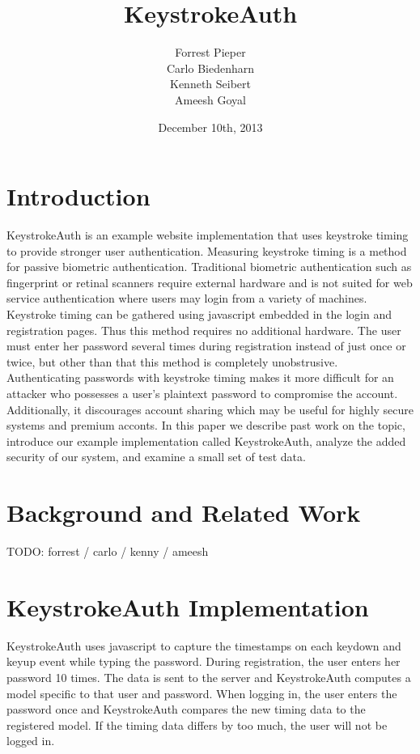 \documentclass{article}
\title{KeystrokeAuth}
\author{
  Forrest Pieper\\
  Carlo Biedenharn\\
  Kenneth Seibert\\
  Ameesh Goyal
}
\date{December 10th, 2013}
\begin{document}
\maketitle

\abstract{
}

\section{Introduction}
\label{introduction}
KeystrokeAuth is an example website implementation that uses keystroke timing to provide stronger user authentication.
Measuring keystroke timing is a method for passive biometric authentication. 
Traditional biometric authentication such as fingerprint or retinal scanners require external hardware and is not suited for web service authentication where users may login from a variety of machines. 
Keystroke timing can be gathered using javascript embedded in the login and registration pages.
Thus this method requires no additional hardware.
The user must enter her password several times during registration instead of just once or twice, but other than that this method is completely unobstrusive.
Authenticating passwords with keystroke timing makes it more difficult for an attacker who possesses a user's plaintext password to compromise the account.
Additionally, it discourages account sharing which may be useful for highly secure systems and premium acconts.
In this paper we describe past work on the topic, introduce our example implementation called KeystrokeAuth, analyze the added security of our system, and examine a small set of test data.

\section{Background and Related Work}
TODO: forrest / carlo / kenny / ameesh


\section{KeystrokeAuth Implementation}
KeystrokeAuth uses javascript to capture the timestamps on each keydown and keyup event while typing the password.
During registration, the user enters her password 10 times.
The data is sent to the server and KeystrokeAuth computes a model specific to that user and password.
When logging in, the user enters the password once and KeystrokeAuth compares the new timing data to the registered model.
If the timing data differs by too much, the user will not be logged in.
\end{document}

